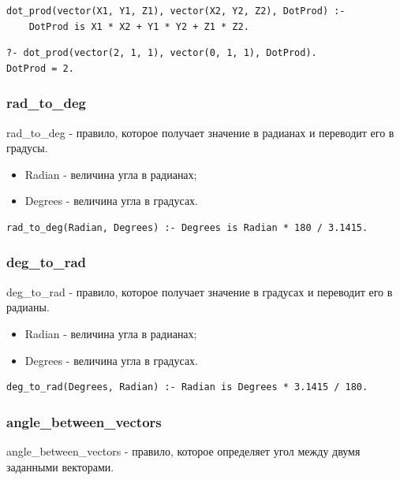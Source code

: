 \begin{lstlisting}[caption=Реализация правила dot\_prod, label=rules:dotprod]
dot_prod(vector(X1, Y1, Z1), vector(X2, Y2, Z2), DotProd) :-
	DotProd is X1 * X2 + Y1 * Y2 + Z1 * Z2.
\end{lstlisting}

\begin{lstlisting}[caption=Пример использования правила dot\_prod, label=example:dotprod]
?- dot_prod(vector(2, 1, 1), vector(0, 1, 1), DotProd).
DotProd = 2.
\end{lstlisting}

\subsubsection{rad\_to\_deg}
\hspace{0.6cm} rad\_to\_deg - правило, которое получает значение в радианах и переводит его в градусы.

\begin{itemize}
	\item Radian - величина угла в радианах;
	\item Degrees - величина угла в градусах.
\end{itemize}

\begin{lstlisting}[caption=Реализация правила rad\_to\_deg, label=rules:radtodeg]
rad_to_deg(Radian, Degrees) :- Degrees is Radian * 180 / 3.1415.
\end{lstlisting}
\subsubsection{deg\_to\_rad}
\hspace{0.6cm} deg\_to\_rad - правило, которое получает значение в градусах и переводит его в радианы.

\begin{itemize}
	\item Radian - величина угла в радианах;
	\item Degrees - величина угла в градусах.
\end{itemize}

\begin{lstlisting}[caption=Реализация правила deg\_to\_rad, label=rules:degtorad]
deg_to_rad(Degrees, Radian) :- Radian is Degrees * 3.1415 / 180.
\end{lstlisting}

\subsubsection{angle\_between\_vectors}
\hspace{0.6cm} angle\_between\_vectors - правило, которое определяет угол между двумя заданными векторами.


